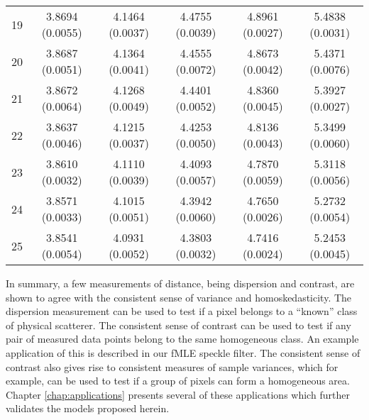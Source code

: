 \begin{table}[H]
\begin{tabular}{c|c|c|c|c|c}
19  &3.8694 (0.0055)  &4.1464 (0.0037)  &4.4755 (0.0039)  &4.8961 (0.0027)  &5.4838 (0.0031)\\
20  &3.8687 (0.0051)  &4.1364 (0.0041)  &4.4555 (0.0072)  &4.8673 (0.0042)  &5.4371 (0.0076)\\
21  &3.8672 (0.0064)  &4.1268 (0.0049)  &4.4401 (0.0052)  &4.8360 (0.0045)  &5.3927 (0.0027)\\
22  &3.8637 (0.0046)  &4.1215 (0.0037)  &4.4253 (0.0050)  &4.8136 (0.0043)  &5.3499 (0.0060)\\
23  &3.8610 (0.0032)  &4.1110 (0.0039)  &4.4093 (0.0057)  &4.7870 (0.0059)  &5.3118 (0.0056)\\
24  &3.8571 (0.0033)  &4.1015 (0.0051)  &4.3942 (0.0060)  &4.7650 (0.0026)  &5.2732 (0.0054)\\
25  &3.8541 (0.0054)  &4.0931 (0.0052)  &4.3803 (0.0032)  &4.7416 (0.0024)  &5.2453 (0.0045)
\end{tabular}

\end{table}

In summary, a few measurements of distance, being dispersion and contrast, are shown to agree with the consistent sense of variance and homoskedasticity.
The dispersion measurement can be used to test 
if a pixel belongs to a ``known'' class of physical scatterer.
The consistent sense of contrast can be used to test if any pair of measured data points belong to  the same homogeneous class.
An example application of this is described in our fMLE speckle filter.
The consistent sense 
of contrast also gives rise to consistent measures of sample variances, which for example, can be used to test 
if a group of pixels can form a homogeneous area.
Chapter \ref{chap:applications} presents several of these applications which further validates the models proposed herein.
